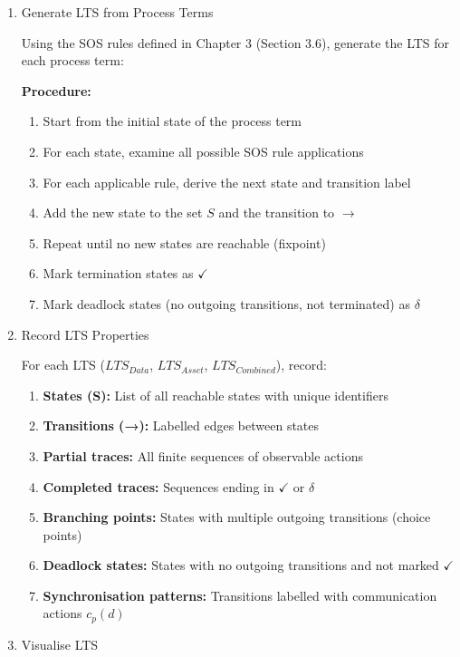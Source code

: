 \begin{enumerate}
\item
  Generate LTS from Process Terms

  Using the SOS rules defined in Chapter 3 (Section 3.6), generate the
  LTS for each process term:

  \textbf{Procedure:}

  \begin{enumerate}
      \item Start from the initial state of the process term
      \item For each state, examine all possible SOS rule applications
      \item For each applicable rule, derive the next state and transition label
      \item Add the new state to the set \(S\) and the transition to \(\rightarrow\)
      \item Repeat until no new states are reachable (fixpoint)
      \item Mark termination states as \(\checkmark\)
      \item Mark deadlock states (no outgoing transitions, not terminated) as \(\delta\)
  \end{enumerate}
\item
  Record LTS Properties

  For each LTS (\(LTS_{Data}\), \(LTS_{Asset}\), \(LTS_{Combined}\)),
  record:

  \begin{enumerate}
      \item \textbf{States (S):} List of all reachable states with unique identifiers
      \item \textbf{Transitions (→):} Labelled edges between states
      \item \textbf{Partial traces:} All finite sequences of observable actions
      \item \textbf{Completed traces:} Sequences ending in \(\checkmark\) or \(\delta\)
      \item \textbf{Branching points:} States with multiple outgoing transitions (choice points)
      \item \textbf{Deadlock states:} States with no outgoing transitions and not marked \(\checkmark\)
      \item \textbf{Synchronisation patterns:} Transitions labelled with communication actions \(c_p(d)\)
  \end{enumerate}
\item
  Visualise LTS


\end{enumerate}

